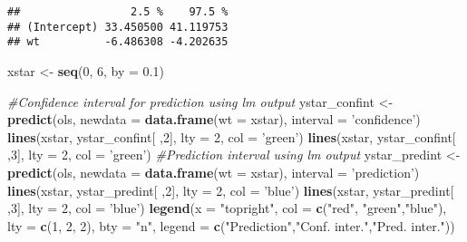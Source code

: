 \documentclass[]{book}
\newenvironment{Shaded}{\begin{snugshade}}{\end{snugshade}}
\newcommand{\CommentTok}[1]{\textcolor[rgb]{0.56,0.35,0.01}{\textit{#1}}}
\newcommand{\DataTypeTok}[1]{\textcolor[rgb]{0.13,0.29,0.53}{#1}}
\newcommand{\DecValTok}[1]{\textcolor[rgb]{0.00,0.00,0.81}{#1}}
\newcommand{\FloatTok}[1]{\textcolor[rgb]{0.00,0.00,0.81}{#1}}
\newcommand{\KeywordTok}[1]{\textcolor[rgb]{0.13,0.29,0.53}{\textbf{#1}}}
\newcommand{\NormalTok}[1]{#1}
\newcommand{\StringTok}[1]{\textcolor[rgb]{0.31,0.60,0.02}{#1}}
\theoremstyle{definition}
\theoremstyle{definition}
\theoremstyle{definition}
\theoremstyle{remark}
\begin{document}
\begin{verbatim}
##                 2.5 %    97.5 %
## (Intercept) 33.450500 41.119753
## wt          -6.486308 -4.202635
\end{verbatim}

\begin{Shaded}
\begin{Highlighting}[]
\NormalTok{xstar <-}\StringTok{ }\KeywordTok{seq}\NormalTok{(}\DecValTok{0}\NormalTok{, }\DecValTok{6}\NormalTok{, }\DataTypeTok{by =} \FloatTok{0.1}\NormalTok{)}

\CommentTok{#Confidence interval for prediction using lm output}
\NormalTok{ystar_confint <-}\StringTok{ }\KeywordTok{predict}\NormalTok{(ols, }\DataTypeTok{newdata =} \KeywordTok{data.frame}\NormalTok{(}\DataTypeTok{wt =}\NormalTok{ xstar), }\DataTypeTok{interval =} \StringTok{'confidence'}\NormalTok{)}
\KeywordTok{lines}\NormalTok{(xstar, ystar_confint[ ,}\DecValTok{2}\NormalTok{], }\DataTypeTok{lty =} \DecValTok{2}\NormalTok{, }\DataTypeTok{col =} \StringTok{'green'}\NormalTok{)}
\KeywordTok{lines}\NormalTok{(xstar, ystar_confint[ ,}\DecValTok{3}\NormalTok{], }\DataTypeTok{lty =} \DecValTok{2}\NormalTok{, }\DataTypeTok{col =} \StringTok{'green'}\NormalTok{)}
\CommentTok{#Prediction interval using lm output}
\NormalTok{ystar_predint <-}\StringTok{ }\KeywordTok{predict}\NormalTok{(ols, }\DataTypeTok{newdata =} \KeywordTok{data.frame}\NormalTok{(}\DataTypeTok{wt =}\NormalTok{ xstar), }\DataTypeTok{interval =} \StringTok{'prediction'}\NormalTok{)}
\KeywordTok{lines}\NormalTok{(xstar, ystar_predint[ ,}\DecValTok{2}\NormalTok{], }\DataTypeTok{lty =} \DecValTok{2}\NormalTok{, }\DataTypeTok{col =} \StringTok{'blue'}\NormalTok{)}
\KeywordTok{lines}\NormalTok{(xstar, ystar_predint[ ,}\DecValTok{3}\NormalTok{], }\DataTypeTok{lty =} \DecValTok{2}\NormalTok{, }\DataTypeTok{col =} \StringTok{'blue'}\NormalTok{)}
\KeywordTok{legend}\NormalTok{(}\DataTypeTok{x =} \StringTok{"topright"}\NormalTok{, }\DataTypeTok{col =} \KeywordTok{c}\NormalTok{(}\StringTok{"red"}\NormalTok{, }\StringTok{"green"}\NormalTok{,}\StringTok{"blue"}\NormalTok{), }
       \DataTypeTok{lty =} \KeywordTok{c}\NormalTok{(}\DecValTok{1}\NormalTok{, }\DecValTok{2}\NormalTok{, }\DecValTok{2}\NormalTok{), }\DataTypeTok{bty =} \StringTok{"n"}\NormalTok{,}
       \DataTypeTok{legend =} \KeywordTok{c}\NormalTok{(}\StringTok{"Prediction"}\NormalTok{,}\StringTok{"Conf. inter."}\NormalTok{,}\StringTok{"Pred. inter."}\NormalTok{))}
\end{Highlighting}
\end{Shaded}
\end{document}
